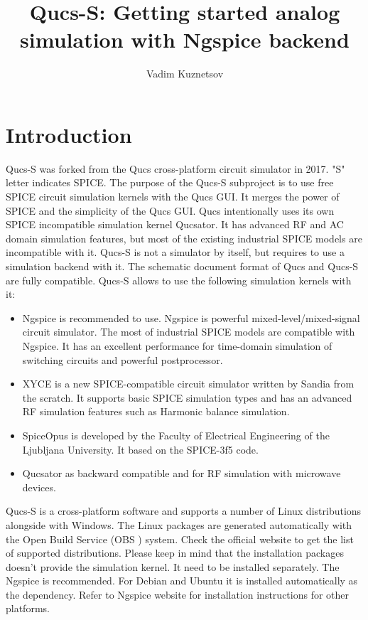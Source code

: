 \documentclass[a4paper,12pt]{article}
\title{Qucs-S: Getting started analog simulation with Ngspice backend}
\author{Vadim Kuznetsov}
\begin{document}
\maketitle



\section{Introduction} \label{sec:intro}

Qucs-S was forked from the Qucs cross-platform circuit simulator in 2017. "S" letter indicates SPICE. The purpose of the Qucs-S subproject is to use free SPICE circuit simulation kernels with the Qucs GUI. It merges the power of SPICE and the simplicity of the Qucs GUI. Qucs intentionally uses its own SPICE incompatible simulation kernel Qucsator. It has advanced RF and AC domain simulation features, but most of the existing industrial SPICE models are incompatible with it. Qucs-S is not a simulator by itself, but requires to use a simulation backend with it. The schematic document format of Qucs and Qucs-S are fully compatible. Qucs-S allows to use the following simulation kernels with it:

\begin{itemize}
 \item  Ngspice is recommended to use. Ngspice is powerful mixed-level/mixed-signal circuit simulator. The most of industrial SPICE models are compatible with Ngspice. It has an excellent performance for time-domain simulation of switching circuits and powerful postprocessor.
 \item XYCE is a new SPICE-compatible circuit simulator written by Sandia from the scratch. It supports basic SPICE simulation types and has an advanced RF simulation features such as Harmonic balance simulation.
 \item SpiceOpus is developed by the Faculty of Electrical Engineering of the Ljubljana University. It based on the SPICE-3f5 code.
 \item Qucsator as backward compatible and for RF simulation with microwave devices.
\end{itemize}

Qucs-S is a cross-platform software and supports a number of Linux distributions alongside with Windows\texttrademark. The Linux packages are generated automatically with the Open Build Service (OBS ) system. Check the official website to get the list of supported distributions. Please keep in mind that the installation packages doesn't provide the simulation kernel. It need to be installed separately. The Ngspice is recommended. For Debian and Ubuntu it is installed automatically as the dependency. Refer to Ngspice website for installation instructions for other platforms.
\end{document}
